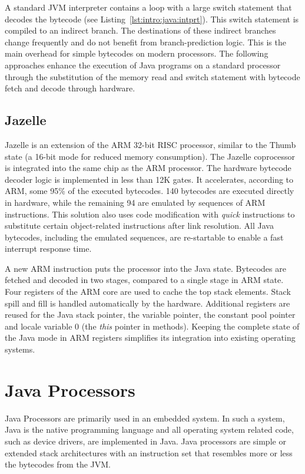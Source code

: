 A standard JVM interpreter contains a loop with a large switch
statement that decodes the bytecode (see
Listing~\ref{lst:intro:java:intprt}). This switch statement is
compiled to an indirect branch. The destinations of these indirect
branches change frequently and do not benefit from branch-prediction
logic. This is the main overhead for simple bytecodes on modern
processors. The following approaches enhance the execution of Java
programs on a standard processor through the substitution of the
memory read and switch statement with bytecode fetch and decode
through hardware.



\subsection{Jazelle} 


Jazelle \cite{Jazelle} is an extension of the ARM 32-bit RISC
processor, similar to the Thumb state (a 16-bit mode for reduced
memory consumption). The Jazelle coprocessor is integrated into the
same chip as the ARM processor. The hardware bytecode decoder logic
is implemented in less than 12K gates. It accelerates, according to
ARM, some 95\% of the executed bytecodes. 140 bytecodes are executed
directly in hardware, while the remaining 94 are emulated by
sequences of ARM instructions. This solution also uses code
modification with \textit{quick} instructions to substitute certain
object-related instructions after link resolution. All Java
bytecodes, including the emulated sequences, are re-startable to
enable a fast interrupt response time.


A new ARM instruction puts the processor into the Java state.
Bytecodes are fetched and decoded in two stages, compared to a single
stage in ARM state. Four registers of the ARM core are used to cache
the top stack elements. Stack spill and fill is handled automatically
by the hardware. Additional registers are reused for the Java stack
pointer, the variable pointer, the constant pool pointer and locale
variable 0 (the \textit{this} pointer in methods). Keeping the
complete state of the Java mode in ARM registers simplifies its
integration into existing operating systems.


\section{Java Processors}

Java Processors are primarily used in an embedded system. In such a
system, Java is the native programming language and all operating
system related code, such as device drivers, are implemented in
Java. Java processors are simple or extended stack architectures
with an instruction set that resembles more or less the bytecodes
from the JVM.

